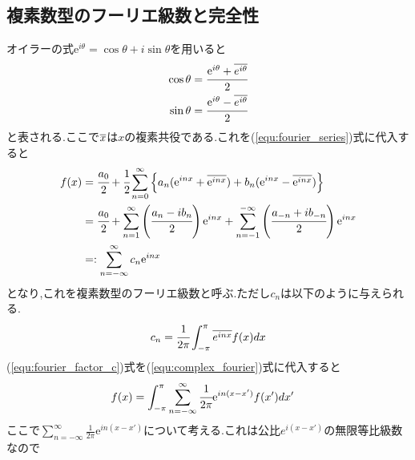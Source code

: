 \subsection{複素数型のフーリエ級数と完全性\cite{shindohado}}
オイラーの式$\mathrm{e}^{i\theta}=\cos\theta+i\sin\theta$を用いると
\begin{align}
  \cos\theta&=\cfrac{\mathrm{e}^{i\theta}+\overline{e^{i\theta}}}{2}\\
  \sin\theta&=\cfrac{\mathrm{e}^{i\theta}-\overline{e^{i\theta}}}{2}
\end{align}
と表される.ここで$\overline{x}$は$x$の複素共役である.これを(\ref{equ:fourier_series})式に代入すると
\begin{align}
  \label{equ:complex_fourier}
  \begin{split}
    f(x)&=\cfrac{a_0}{2}+\cfrac{1}{2}\sum_{n=0}^{\infty} \left\{ a_n (\mathrm{e}^{inx} + \overline{\mathrm{e}^{inx}}) + b_n (\mathrm{e}^{inx} - \overline{\mathrm{e}^{inx}})\right\}\\
    &=\cfrac{a_0}{2}+\sum^{\infty}_{n=1} \left(\cfrac{a_n-ib_n}{2}\right)\mathrm{e}^{inx}+\sum_{n=-1}^{-\infty} \left(\cfrac{a_{-n}+ib_{-n}}{2}\right)\mathrm{e}^{inx}\\
    &=:\sum^{\infty}_{n=-\infty}c_n\mathrm{e}^{inx}
    \end{split}
\end{align}
となり,これを複素数型のフーリエ級数と呼ぶ.ただし$c_n$は以下のように与えられる.
\begin{align}
  \label{equ:fourier_factor_c}
  c_n=\cfrac{1}{2\pi}\int_{-\pi}^{\pi}\overline{e^{inx}}f(x)dx
\end{align}
(\ref{equ:fourier_factor_c})式を(\ref{equ:complex_fourier})式に代入すると
\begin{align}
  \label{equ:complete}
  \begin{split}
    f(x)
    &=\int^{\pi}_{-\pi}\sum^{\infty}_{n=-\infty}\cfrac{1}{2\pi}\mathrm{e}^{in(x-x')}f(x')dx'
  \end{split}
\end{align}
ここで$\sum^{\infty}_{n=-\infty}\tfrac{1}{2\pi}\mathrm{e}^{in(x-x')}$について考える.これは公比$e^{i(x-x')}$の無限等比級数なので
